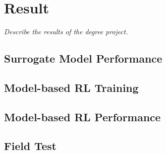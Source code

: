\chapter{Result}
\label{chap5}
\textit{Describe the results of the degree project.}

\section{Surrogate Model Performance}

\section{Model-based RL Training}

\section{Model-based RL Performance}

\section{Field Test}
